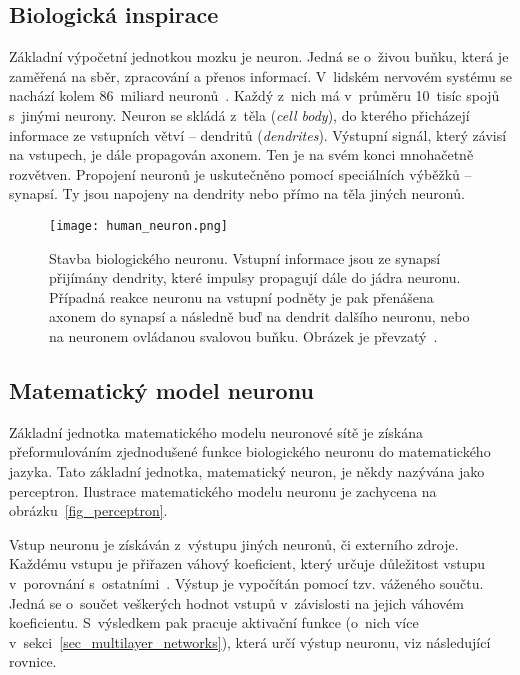 
\subsection*{Biologická inspirace}

Základní výpočetní jednotkou mozku je neuron. Jedná se o~živou buňku, která je zaměřená na sběr, zpracování a přenos informací. V~lidském nervovém systému se nachází kolem 86~miliard neuronů~\cite{tdsNeuralNetworks}. Každý z~nich má v~průměru 10~tisíc spojů s~jinými neurony. Neuron se skládá z~těla (\textit{cell body}), do kterého přicházejí informace ze vstupních větví -- dendritů (\textit{dendrites}). Výstupní signál, který závisí na vstupech, je dále propagován axonem. Ten je na svém konci mnohačetně rozvětven. Propojení neuronů je uskutečněno pomocí speciálních výběžků -- synapsí. Ty jsou napojeny na dendrity nebo přímo na těla jiných neuronů.

\begin{figure}[H]
    \centering
    \texttt{[image: human\_neuron.png]}
    \caption[Stavba biologického neuronu]{Stavba biologického neuronu. Vstupní informace jsou ze synapsí přijímány dendrity, které impulsy propagují dále do jádra neuronu. Případná reakce neuronu na vstupní podněty je pak přenášena axonem do synapsí a následně buď na dendrit dalšího neuronu, nebo na neuronem ovládanou svalovou buňku. Obrázek je převzatý~\cite{tdsNeuralNetworks}.}
\end{figure}


\subsection*{Matematický model neuronu}

Základní jednotka matematického modelu neuronové sítě je získána přeformulováním zjednodušené funkce biologického neuronu do matematického jazyka. Tato základní jednotka, matematický neuron, je někdy nazývána jako perceptron. Ilustrace matematického modelu neuronu je zachycena na obrázku~\ref{fig_perceptron}.

Vstup neuronu je získáván z~výstupu jiných neuronů, či externího zdroje. Každému vstupu je přiřazen váhový koeficient, který určuje důležitost vstupu v~porovnání s~ostatními~\cite{haykinNeuralNetworks}. Výstup je vypočítán pomocí tzv. váženého součtu. Jedná se o~součet veškerých hodnot vstupů v~závislosti na jejich váhovém koeficientu. S~výsledkem pak pracuje aktivační funkce (o~nich více v~sekci~\ref{sec_multilayer_networks}), která určí výstup neuronu, viz následující rovnice.

